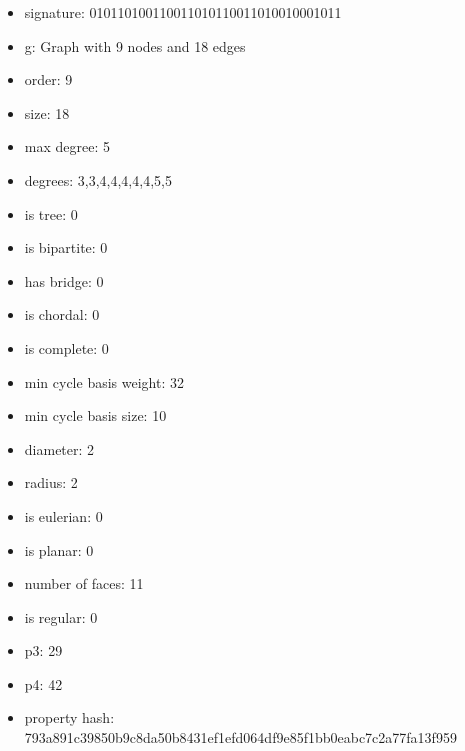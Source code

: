 \newpage
\begin{figure}
\end{figure}
\begin{itemize}
\item signature: 010110100110011010110011010010001011
\item g: Graph with 9 nodes and 18 edges
\item order: 9
\item size: 18
\item max degree: 5
\item degrees: 3,3,4,4,4,4,4,5,5
\item is tree: 0
\item is bipartite: 0
\item has bridge: 0
\item is chordal: 0
\item is complete: 0
\item min cycle basis weight: 32
\item min cycle basis size: 10
\item diameter: 2
\item radius: 2
\item is eulerian: 0
\item is planar: 0
\item number of faces: 11
\item is regular: 0
\item p3: 29
\item p4: 42
\item property hash: 793a891c39850b9c8da50b8431ef1efd064df9e85f1bb0eabc7c2a77fa13f959
\end{itemize}
